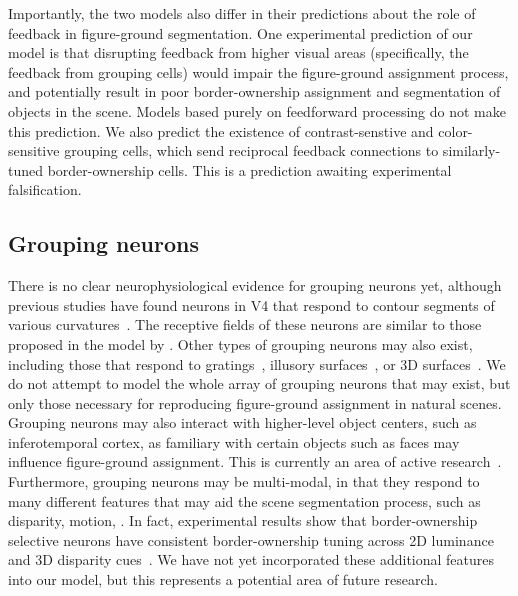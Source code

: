 Importantly, the two models also differ in their predictions about the role of feedback in figure-ground segmentation. One experimental prediction of our model is that disrupting feedback from higher visual areas (specifically, the feedback from grouping cells) would impair the figure-ground assignment process, and potentially result in poor border-ownership assignment and segmentation of objects in the scene. Models based purely on feedforward processing do not make this prediction. We also predict the existence of contrast-senstive and color-sensitive grouping cells, which send reciprocal feedback connections to similarly-tuned border-ownership cells. This is a prediction awaiting experimental falsification.

\subsection{Grouping neurons}
There is no clear neurophysiological evidence for
grouping neurons yet,
although previous studies have found neurons in V4 
that respond to contour segments
of various curvatures~\citep{Pasupathy_Connor02,Brincat_Connor04}. The receptive fields of these neurons are
similar to those proposed in the model by
\cite{Craft_etal07}. Other types of grouping neurons may also exist,
including those that respond to 
gratings~\citep{Hegde_vanEssen07}, illusory
surfaces~\citep{Cox_etal13}, or 3D
surfaces~\citep{He_Nakayama95,Hu_etal15a}.
We do not attempt to model the whole array of grouping neurons that may exist, but
only those necessary for reproducing figure-ground assignment in natural scenes. Grouping neurons may also interact with higher-level object centers, such as inferotemporal cortex, as familiary with certain objects such as faces may influence figure-ground assignment. This is currently an area of active research~\citep{Ko_vonderHeydt17}. Furthermore, grouping neurons may be multi-modal, in that they respond to many different features that may aid the scene segmentation process, such as disparity, motion, \etc. In fact, experimental results show that border-ownership selective neurons have consistent border-ownership tuning across 2D luminance and 3D disparity cues~\citep{Qiu_etal05}. We have not yet incorporated these additional features into our model, but this represents a potential area of future research.

